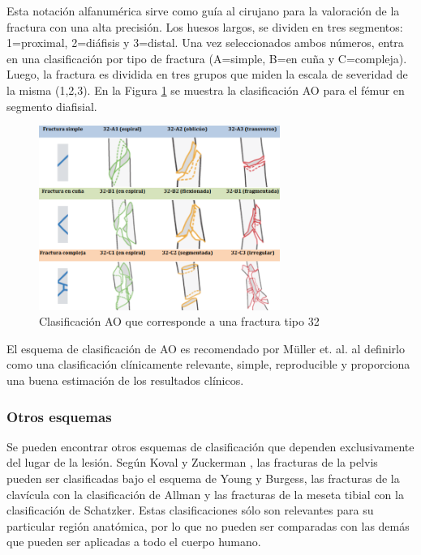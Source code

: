 Esta notaci\'on alfanum\'erica sirve como gu\'ia al cirujano para la valoraci\'on de la fractura con una alta precisi\'on. Los huesos largos, se dividen en tres segmentos: 1=proximal, 2=di\'afisis y 3=distal. Una vez seleccionados ambos n\'umeros, entra en una clasificaci\'on por tipo de fractura (A=simple, B=en cu\~na y C=compleja). Luego, la fractura es dividida en tres grupos que miden la escala de severidad de la misma (1,2,3). En la Figura \ref{fig:AOfemur} se muestra la clasificaci\'on AO para el f\'emur en segmento diafisial.
\begin{figure}[htb]
	\centering
		\includegraphics[width=0.7\textwidth]{images/ao_femur.png}
		\caption{Clasificaci\'on AO que corresponde a una fractura tipo 32}
	\label{fig:AOfemur}
\end{figure}

El esquema de clasificaci\'on de AO es recomendado por M\"{u}ller et. al. \cite{MULL90} al definirlo como una clasificaci\'on cl\'inicamente relevante, simple, reproducible y proporciona una buena estimaci\'on de los resultados cl\'inicos.

\subsubsection{Otros esquemas}

Se pueden encontrar otros esquemas de clasificaci\'on que dependen exclusivamente del lugar de la lesi\'on. Seg\'un Koval y Zuckerman \cite{KOV02}, las fracturas de la pelvis pueden ser clasificadas bajo el esquema de Young y Burgess, las fracturas de la clav\'icula con la clasificaci\'on de Allman y las fracturas de la meseta tibial con la clasificaci\'on de Schatzker. Estas clasificaciones s\'olo son relevantes para su particular regi\'on anat\'omica, por lo que no pueden ser comparadas con las dem\'as que pueden ser aplicadas a todo el cuerpo humano.

